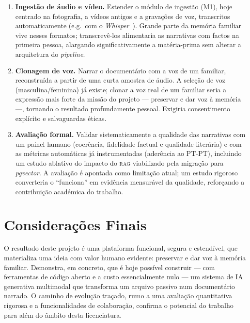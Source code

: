 \begin{enumerate}[leftmargin=*]
  \item \textbf{Ingestão de áudio e vídeo.} Estender o módulo de ingestão
  (M1), hoje centrado na fotografia, a vídeos antigos e a gravações de voz,
  transcritos automaticamente (e.g.\ com o \emph{Whisper}~\cite{radford2023whisper}). Grande parte da
  memória familiar vive nesses formatos; transcrevê-los alimentaria as
  narrativas com factos na primeira pessoa, alargando significativamente a
  matéria-prima sem alterar a arquitetura do \emph{pipeline}.

  \item \textbf{Clonagem de voz.} Narrar o documentário com a voz de um
  familiar, reconstruída a partir de uma curta amostra de áudio. A seleção de
  voz (masculina/feminina) já existe; clonar a voz real de um familiar seria a
  expressão mais forte da missão do projeto --- preservar e dar voz à memória
  ---, tornando o resultado profundamente pessoal. Exigiria consentimento
  explícito e salvaguardas éticas.

  \item \textbf{Avaliação formal.} Validar sistematicamente a qualidade das
  narrativas com um painel humano (coerência, fidelidade factual e qualidade
  literária) e com as métricas automáticas já instrumentadas (aderência ao
  PT-PT), incluindo um estudo ablativo do impacto do \textsc{rag} viabilizado
  pela migração para \emph{pgvector}. A avaliação é apontada como limitação
  atual; um estudo rigoroso converteria o ``funciona'' em evidência mensurável
  da qualidade, reforçando a contribuição académica do trabalho.
\end{enumerate}

\section{Considerações Finais}
\label{sec:final}

O resultado deste projeto é uma plataforma funcional, segura e
estendível, que materializa uma ideia com valor humano evidente:
preservar e dar voz à memória familiar. Demonstra, em concreto, que é
hoje possível construir — com ferramentas de código aberto e a custo
essencialmente nulo — um sistema de IA generativa multimodal que
transforma um arquivo passivo num documentário narrado. O caminho de
evolução traçado, rumo a uma avaliação quantitativa rigorosa e a
funcionalidades de colaboração, confirma o potencial do trabalho para além
do âmbito desta licenciatura.
